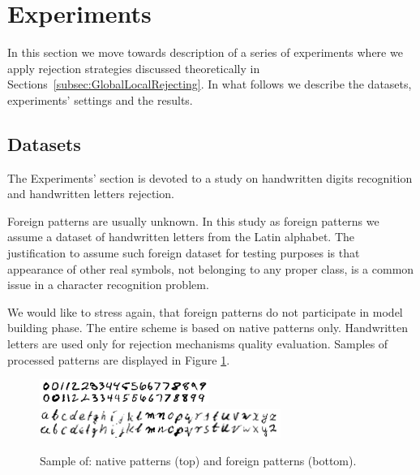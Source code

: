 \documentclass{llncs}
\begin{document}
\section{Experiments}
  \label{sec:Experiments}

In this section we move towards description of a series of experiments where we apply rejection strategies discussed theoretically in Sections~\ref{subsec:GlobalLocalRejecting}. In what follows we describe the datasets, experiments' settings and the results. 

\subsection{Datasets}

The Experiments' section is devoted to a study on handwritten digits recognition and handwritten letters rejection. 

Foreign patterns are usually unknown. In this study as foreign patterns we assume a dataset of handwritten letters from the Latin alphabet. The justification to assume such foreign dataset for testing purposes is that appearance of other real symbols, not belonging to any proper class, is a common issue in a character recognition problem. 

We would like to stress again, that foreign patterns do not participate in model building phase. The entire scheme is based on native patterns only. Handwritten letters are used only for rejection mechanisms quality evaluation. Samples of processed patterns are displayed in Figure \ref{fig:nativeforeignpatterns}.

\begin{figure}[!tbp]
\vspace{-6pt}
  \centering
  \includegraphics[width=0.49\textwidth]{_Figures/natives}\\
  \includegraphics[width=0.7\textwidth]{_Figures/foreigns}
\vspace{-6pt}
  \caption{Sample of: native patterns (top) and foreign patterns (bottom).}
\label{fig:nativeforeignpatterns}
\vspace{-12pt}
\end{figure}
\end{document}
